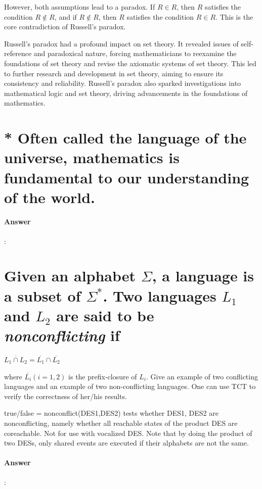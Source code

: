 \documentclass{article}
\begin{document}
However, both assumptions lead to a paradox. If $R \in R$, then $R$ satisfies the condition $R \notin R$, and if $R \notin R$, then $R$ satisfies the condition $R \in R$. This is the core contradiction of Russell's paradox.

Russell's paradox had a profound impact on set theory. It revealed issues of self-reference and paradoxical nature, forcing mathematicians to reexamine the foundations of set theory and revise the axiomatic systems of set theory. This led to further research and development in set theory, aiming to ensure its consistency and reliability. Russell's paradox also sparked investigations into mathematical logic and set theory, driving advancements in the foundations of mathematics.

\section{* Often called the language of the universe, mathematics is fundamental to our understanding of the world.}

\paragraph{Answer}:

\section{Given an alphabet $\Sigma$, a language is a subset of $\Sigma^*$. Two languages $L_1$ and $L_2$ are said to be \textit{nonconflicting} if}

$\overline{L_1 \cap L_2} = \overline{L_1} \cap \overline{L_2} $

where $\overline{L_i} (i = 1, 2)$ is the prefix-closure of $L_i$. Give an example of two conflicting languages and an example of two non-conflicting languages. One can use TCT to verify the correctness of her/his results.

\begin{tcolorbox}
  true/false = nonconflict(DES1,DES2) tests whether DES1, DES2 are nonconflicting, namely whether all reachable states of the product DES are coreachable. Not for use with vocalized DES. Note that by doing the product of two DESs, only shared events are executed if their alphabets are not the same.
\end{tcolorbox}

\paragraph{Answer}:
\end{document}
